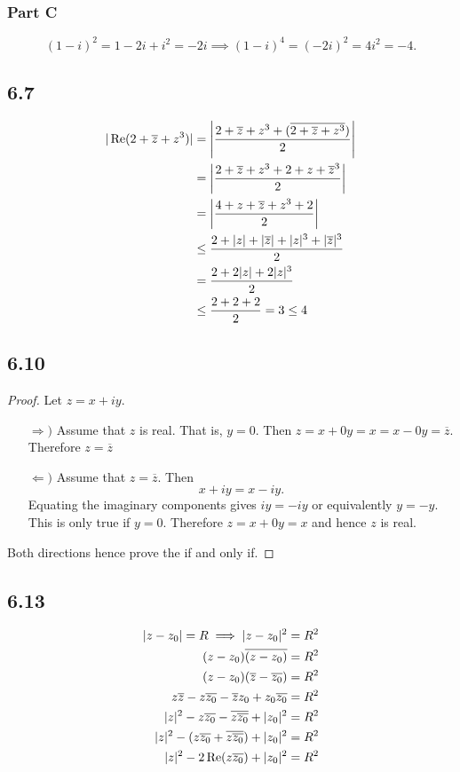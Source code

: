 \documentclass[12pt,titlepage]{extarticle}
\begin{document}
\subsubsection*{Part C}
\[
    (1-i)^2 = 1 - 2i + i^2 = -2i \implies (1-i)^4 = (-2i)^2 = 4i^2 = -4
.\]

\subsection*{6.7}
\begin{align*}
    |\Re(2+\overline{z} + z^3)| &= \qty|\frac{2 + \overline{z} + z^3 + (\overline{2 + \overline{z} + z^3})}{2}| \\
    &= \qty|\frac{2 + \overline{z} + z^3 + 2 + z + \overline{z}^3}{2}| \\
    &= \qty|\frac{4 + z + \overline{z} + z^3 + 2}{2}| \\
    &\leq \frac{2 + |z| + |\overline{z}| + |z|^3 + |\overline{z}|^3}{2} \\
    &= \frac{2 + 2|z| + 2|z|^3}{2} \\
    &\leq \frac{2 + 2 + 2}{2} = 3 \leq 4
\end{align*}

\subsection*{6.10}
\begin{proof}
    Let $z = x + iy$.
    \begin{enumerate}
        \item[$\Rightarrow)$]
            Assume that $z$ is real. That is, $y = 0$. Then $z = x + 0y = x = x - 0y = \overline{z}$. Therefore $z = \overline{z}$
        \item[$\Leftarrow)$]
            Assume that $z = \overline{z}$. Then
            \[
                x + iy = x - iy
            .\]
            Equating the imaginary components gives $iy = - iy$ or equivalently $y = -y$. This is only true if $y = 0$. Therefore $z = x + 0y = x$ and hence $z$ is real.
    \end{enumerate}
    Both directions hence prove the if and only if.
\end{proof}

\subsection*{6.13}
\begin{align*}
    |z - z_0| = R \implies |z - z_0|^2 &= R^2 \\
    (z - z_0)\overline{(z - z_0)} &= R^2 \\
    (z - z_0) (\overline{z} - \overline{z_0}) &= R^2 \\
    z \overline{z} - z \overline{z_0} - \overline{z} z_0 + z_0 \overline{z_0} &= R^2 \\
    |z|^2 - z \overline{z_0} - \overline{z \overline{z_0}} + |z_0|^2 &= R^2 \\
    |z|^2 - (z \overline{z_0} + \overline{z \overline{z_0}}) + |z_0|^2 &= R^2 \\
    |z|^2 - 2 \Re(z \overline{z_0}) + |z_0|^2 &= R^2
\end{align*}
\end{document}
